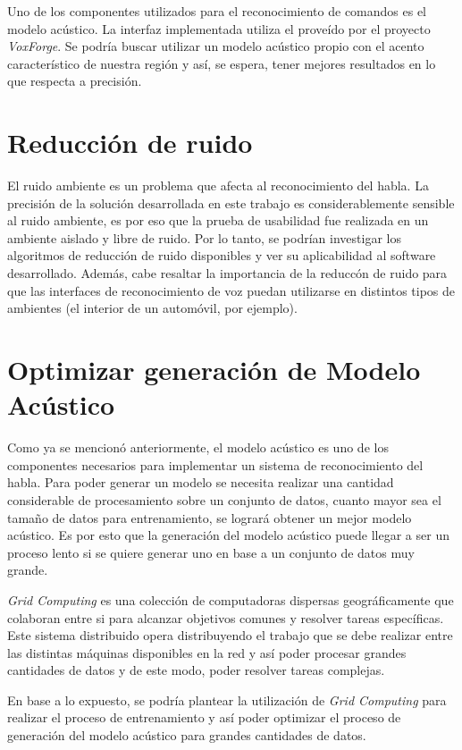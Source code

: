 Uno de los componentes utilizados para el reconocimiento de comandos es el modelo ac\'ustico. La interfaz implementada
utiliza el prove\'ido por el proyecto \emph{VoxForge}. Se podr\'ia buscar utilizar un modelo ac\'ustico propio con el
acento caracter\'istico de nuestra regi\'on y as\'i, se espera, tener mejores resultados en lo que respecta a precisi\'on.

\section{Reducci\'on de ruido}

El ruido ambiente es un problema que afecta al reconocimiento del habla. La precisi\'on de la soluci\'on desarrollada en este trabajo es 
considerablemente sensible al ruido ambiente, es por eso que la prueba de usabilidad fue realizada en un ambiente aislado
y libre de ruido. Por lo tanto, se podr\'ian investigar los algoritmos de reducci\'on de ruido disponibles y ver su aplicabilidad
al software desarrollado. Adem\'as, cabe resaltar la importancia de la reducc\'on de ruido para que las interfaces de reconocimiento
de voz puedan utilizarse en distintos tipos de ambientes (el interior de un autom\'ovil, por ejemplo).

\section{Optimizar generaci\'on de Modelo Ac\'ustico}

Como ya se mencion\'o anteriormente, el modelo ac\'ustico es uno de los componentes necesarios para implementar un sistema de 
reconocimiento del habla. Para poder generar un modelo se necesita realizar una cantidad considerable de procesamiento sobre
un conjunto de datos, cuanto mayor sea el tama\~no de datos para entrenamiento, se lograr\'a obtener un mejor modelo ac\'ustico. Es por
esto que la generaci\'on del modelo ac\'ustico puede llegar a ser un proceso lento si se quiere generar uno en base a un conjunto de datos
muy grande.

\emph{Grid Computing} es una colecci\'on de computadoras dispersas geogr\'aficamente que colaboran entre si para alcanzar objetivos comunes y resolver
tareas espec\'ificas. Este sistema distribuido opera distribuyendo el trabajo que se debe realizar entre las distintas m\'aquinas disponibles en la red
y as\'i poder procesar grandes cantidades de datos y de este modo, poder resolver tareas complejas.

En base a lo expuesto, se podr\'ia plantear la utilizaci\'on de \emph{Grid Computing} para realizar el proceso de entrenamiento y as\'i
poder optimizar el proceso de generaci\'on del modelo ac\'ustico para grandes cantidades de datos.

